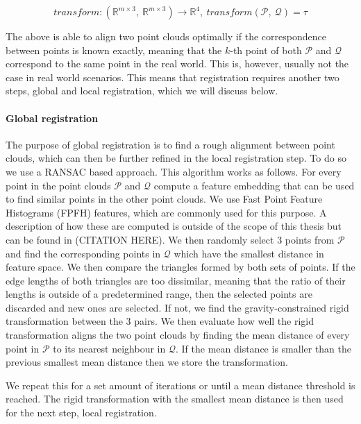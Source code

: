\begin{equation}
    transform: (\mathbb{R}^{m \times 3},\ \mathbb{R}^{m \times 3}) \rightarrow \mathbb{R}^4,\ transform(\mathcal{P},\ \mathcal{Q}) = \tau
\end{equation}

The above is able to align two point clouds optimally if the correspondence between points is known exactly, meaning that the \(k\)-th point of both \(\mathcal{P}\) and \(\mathcal{Q}\) correspond to the same point in the real world. This is, however, usually not the case in real world scenarios. This means that registration requires another two steps, global and local registration, which we will discuss below.

\paragraph{Global registration}
The purpose of global registration is to find a rough alignment between point clouds, which can then be further refined in the local registration step. To do so we use a RANSAC based approach. This algorithm works as follows. For every point in the point clouds \(\mathcal{P}\) and \(\mathcal{Q}\) compute a feature embedding that can be used to find similar points in the other point clouds. We use Fast Point Feature Histograms (FPFH) features, which are commonly used for this purpose. A description of how these are computed is outside of the scope of this thesis but can be found in (CITATION HERE). We then randomly select 3 points from \(\mathcal{P}\) and find the corresponding points in \(\mathcal{Q}\) which have the smallest distance in feature space. We then compare the triangles formed by both sets of points. If the edge lengths of both triangles are too dissimilar, meaning that the ratio of their lengths is outside of a predetermined range, then the selected points are discarded and new ones are selected. If not, we find the gravity-constrained rigid transformation between the 3 pairs. We then evaluate how well the rigid transformation aligns the two point clouds by finding the mean distance of every point in \(\mathcal{P}\) to its nearest neighbour in \(\mathcal{Q}\). If the mean distance is smaller than the previous smallest mean distance then we store the transformation.

We repeat this for a set amount of iterations or until a mean distance threshold is reached. The rigid transformation with the smallest mean distance is then used for the next step, local registration.

